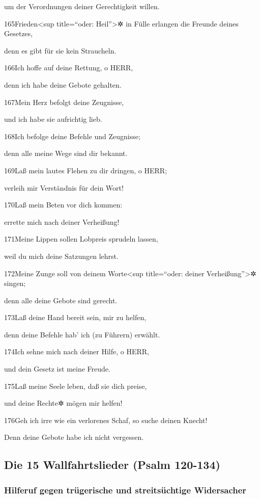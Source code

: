 um der Verordnungen deiner Gerechtigkeit willen.

165Frieden\textless sup title=``oder: Heil''\textgreater✲ in Fülle
erlangen die Freunde deines Gesetzes,

denn es gibt für sie kein Straucheln.

166Ich hoffe auf deine Rettung, o HERR,

denn ich habe deine Gebote gehalten.

167Mein Herz befolgt deine Zeugnisse,

und ich habe sie aufrichtig lieb.

168Ich befolge deine Befehle und Zeugnisse;

denn alle meine Wege sind dir bekannt.

169Laß mein lautes Flehen zu dir dringen, o HERR;

verleih mir Verständnis für dein Wort!

170Laß mein Beten vor dich kommen:

errette mich nach deiner Verheißung!

171Meine Lippen sollen Lobpreis sprudeln lassen,

weil du mich deine Satzungen lehrst.

172Meine Zunge soll von deinem Worte\textless sup title=``oder: deiner
Verheißung''\textgreater✲ singen;

denn alle deine Gebote sind gerecht.

173Laß deine Hand bereit sein, mir zu helfen,

denn deine Befehle hab' ich (zu Führern) erwählt.

174Ich sehne mich nach deiner Hilfe, o HERR,

und dein Gesetz ist meine Freude.

175Laß meine Seele leben, daß sie dich preise,

und deine Rechte✲ mögen mir helfen!

176Geh ich irre wie ein verlorenes Schaf, so suche deinen Knecht!

Denn deine Gebote habe ich nicht vergessen.

\hypertarget{die-15-wallfahrtslieder-psalm-120-134}{%
\subsection{Die 15 Wallfahrtslieder (Psalm
120-134)}\label{die-15-wallfahrtslieder-psalm-120-134}}

\hypertarget{hilferuf-gegen-truxfcgerische-und-streitsuxfcchtige-widersacher}{%
\subsubsection{Hilferuf gegen trügerische und streitsüchtige
Widersacher}\label{hilferuf-gegen-truxfcgerische-und-streitsuxfcchtige-widersacher}}

